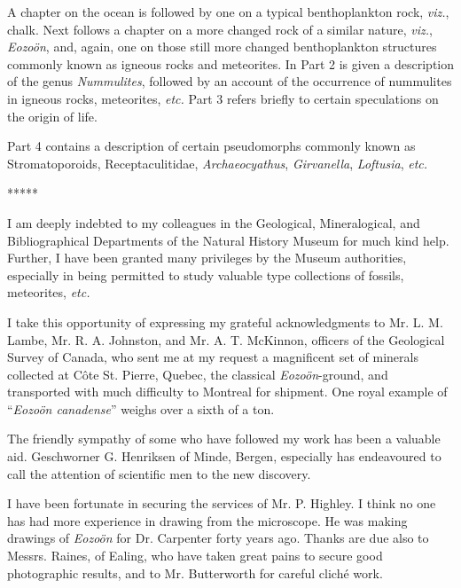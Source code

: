 \documentclass[a4paper, 12pt, oneside]{article}
\begin{document}
A chapter on the ocean is followed by one on a typical benthoplankton rock, \emph{viz.}, chalk. Next follows a chapter on a more changed rock of a similar nature, \emph{viz.}, \emph{Eozoön}, and, again, one on those still more changed benthoplankton structures commonly known as igneous rocks and meteorites. In Part 2 is given a description of the genus \emph{Nummulites}, followed by an account of the occurrence of nummulites in igneous rocks, meteorites, \emph{etc.} Part 3 refers briefly to certain speculations on the origin of life.

Part 4 contains a description of certain pseudomorphs commonly known as Stromatoporoids, Receptaculitidae, \emph{Archaeocyathus}, \emph{Girvanella}, \emph{Loftusia}, \emph{etc.}

\centerline{*\hspace{15mm}*\hspace{15mm}*\hspace{15mm}*\hspace{15mm}*}
\bigskip

I am deeply indebted to my colleagues in the Geological, Mineralogical, and Bibliographical Departments of the Natural History Museum for much kind help. Further, I have been granted many privileges by the Museum authorities, especially in being permitted to study valuable type collections of fossils, meteorites, \emph{etc.}

I take this opportunity of expressing my grateful acknowledgments to Mr. L. M. Lambe, Mr. R. A. Johnston, and Mr. A. T. McKinnon, officers of the Geological Survey of Canada, who sent me at my request a magnificent set of minerals collected at Côte St. Pierre, Quebec, the classical \emph{Eozoön}-ground, and transported with much difficulty to Montreal for shipment. One royal example of ``\emph{Eozoön canadense}'' weighs over a sixth of a ton.

The friendly sympathy of some who have followed my work has been a valuable aid. Geschworner G. Henriksen of Minde, Bergen, especially has endeavoured to call the attention of scientific men to the new discovery.

I have been fortunate in securing the services of Mr. P. Highley. I think no one has had more experience in drawing from the microscope. He was making drawings of \emph{Eozoön} for Dr. Carpenter forty years ago. Thanks are due also to Messrs. Raines, of Ealing, who have taken great pains to secure good photographic results, and to Mr. Butterworth for careful cliché work.
\end{document}
